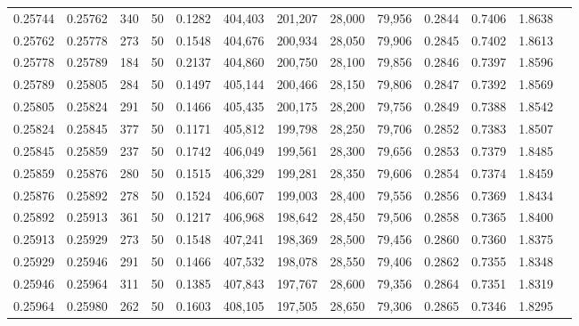 \begin{tabular}{rrrrrrrrrrrrr}
0.25744 & 0.25762 &   340 &  50 &                                     0.1282 & 404,403 & 201,207 &  28,000 &  79,956 & 0.2844 & 0.7406 & 1.8638 \\
0.25762 & 0.25778 &   273 &  50 &                                     0.1548 & 404,676 & 200,934 &  28,050 &  79,906 & 0.2845 & 0.7402 & 1.8613 \\
0.25778 & 0.25789 &   184 &  50 &                                     0.2137 & 404,860 & 200,750 &  28,100 &  79,856 & 0.2846 & 0.7397 & 1.8596 \\
0.25789 & 0.25805 &   284 &  50 &                                     0.1497 & 405,144 & 200,466 &  28,150 &  79,806 & 0.2847 & 0.7392 & 1.8569 \\
0.25805 & 0.25824 &   291 &  50 &                                     0.1466 & 405,435 & 200,175 &  28,200 &  79,756 & 0.2849 & 0.7388 & 1.8542 \\
0.25824 & 0.25845 &   377 &  50 &                                     0.1171 & 405,812 & 199,798 &  28,250 &  79,706 & 0.2852 & 0.7383 & 1.8507 \\
0.25845 & 0.25859 &   237 &  50 &                                     0.1742 & 406,049 & 199,561 &  28,300 &  79,656 & 0.2853 & 0.7379 & 1.8485 \\
0.25859 & 0.25876 &   280 &  50 &                                     0.1515 & 406,329 & 199,281 &  28,350 &  79,606 & 0.2854 & 0.7374 & 1.8459 \\
0.25876 & 0.25892 &   278 &  50 &                                     0.1524 & 406,607 & 199,003 &  28,400 &  79,556 & 0.2856 & 0.7369 & 1.8434 \\
0.25892 & 0.25913 &   361 &  50 &                                     0.1217 & 406,968 & 198,642 &  28,450 &  79,506 & 0.2858 & 0.7365 & 1.8400 \\
0.25913 & 0.25929 &   273 &  50 &                                     0.1548 & 407,241 & 198,369 &  28,500 &  79,456 & 0.2860 & 0.7360 & 1.8375 \\
0.25929 & 0.25946 &   291 &  50 &                                     0.1466 & 407,532 & 198,078 &  28,550 &  79,406 & 0.2862 & 0.7355 & 1.8348 \\
0.25946 & 0.25964 &   311 &  50 &                                     0.1385 & 407,843 & 197,767 &  28,600 &  79,356 & 0.2864 & 0.7351 & 1.8319 \\
0.25964 & 0.25980 &   262 &  50 &                                     0.1603 & 408,105 & 197,505 &  28,650 &  79,306 & 0.2865 & 0.7346 & 1.8295 \\

\end{tabular}
